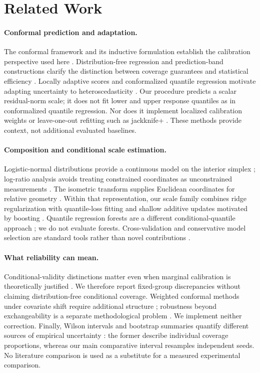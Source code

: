\documentclass{article}
\begin{document}
\section{Related Work}
\paragraph{Conformal prediction and adaptation.}
The conformal framework and its inductive formulation establish the calibration perspective used here \citep{Vovk2005,Papadopoulos2002}. Distribution-free regression and prediction-band constructions clarify the distinction between coverage guarantees and statistical efficiency \citep{Lei2018,LeiWasserman2014}. Locally adaptive scores and conformalized quantile regression motivate adapting uncertainty to heteroscedasticity \citep{AngelopoulosBates2021,Romano2019}. Our procedure predicts a scalar residual-norm scale; it does not fit lower and upper response quantiles as in conformalized quantile regression. Nor does it implement localized calibration weights \citep{Guan2023} or leave-one-out refitting such as jackknife+ \citep{Barber2021}. These methods provide context, not additional evaluated baselines.

\paragraph{Composition and conditional scale estimation.}
Logistic-normal distributions provide a continuous model on the interior simplex \citep{AitchisonShen1980}; log-ratio analysis avoids treating constrained coordinates as unconstrained measurements \citep{Aitchison1982}. The isometric transform supplies Euclidean coordinates for relative geometry \citep{Egozcue2003}. Within that representation, our scale family combines ridge regularization \citep{HoerlKennard1970} with quantile-loss fitting \citep{KoenkerBassett1978,KoenkerHallock2001} and shallow additive updates motivated by boosting \citep{Friedman2001,Friedman2002}. Quantile regression forests are a different conditional-quantile approach \citep{Meinshausen2006}; we do not evaluate forests. Cross-validation and conservative model selection are standard tools rather than novel contributions \citep{Stone1974,Hastie2009}.

\paragraph{What reliability can mean.}
Conditional-validity distinctions matter even when marginal calibration is theoretically justified \citep{Vovk2012,BarberLimits2021}. We therefore report fixed-group discrepancies without claiming distribution-free conditional coverage. Weighted conformal methods under covariate shift require additional structure \citep{Tibshirani2019}; robustness beyond exchangeability is a separate methodological problem \citep{BarberBeyond2023}. We implement neither correction. Finally, Wilson intervals and bootstrap summaries quantify different sources of empirical uncertainty \citep{Wilson1927,Efron1979}: the former describe individual coverage proportions, whereas our main comparative interval resamples independent seeds. No literature comparison is used as a substitute for a measured experimental comparison.
\end{document}
